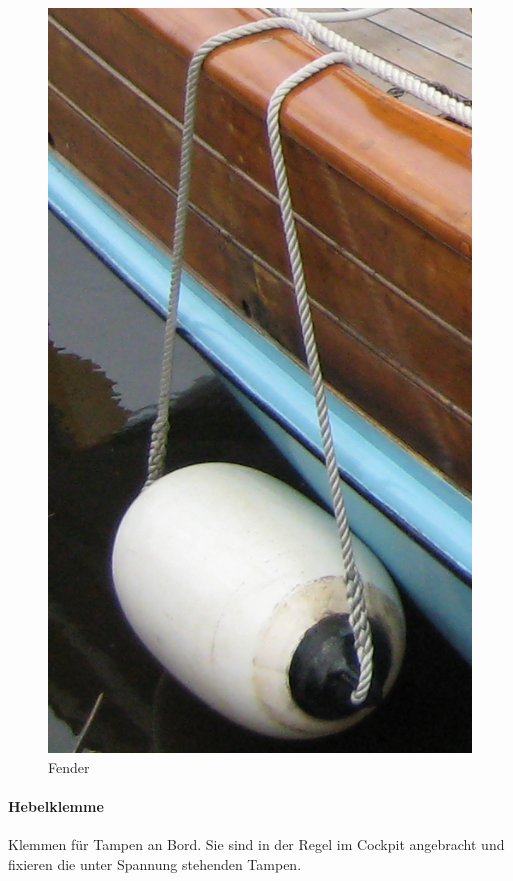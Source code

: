 \documentclass[12pt]{article}
\begin{document}
\begin{figure}[H]
\begin{center}
\includegraphics[scale=0.2]{bilder/fender.jpg}
\end{center}
\caption{Fender}
\label{fender}
\end{figure}

\paragraph{Hebelklemme}
Klemmen für Tampen an Bord. Sie sind in der Regel im Cockpit angebracht und fixieren die unter Spannung stehenden Tampen.
\end{document}
